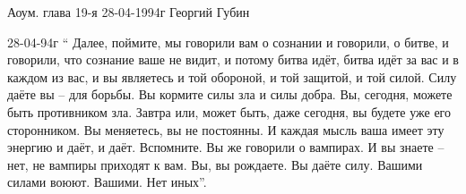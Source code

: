 Аоум. глава 19-я 28-04-1994г
Георгий Губин
 
\people{**}
 28-04-94г   `` Далее, поймите, мы говорили вам о сознании и говорили, о битве, и говорили, что сознание ваше не видит, и потому битва идёт, битва идёт за вас и в каждом из вас, и вы являетесь и той обороной, и той защитой, и той силой. Силу даёте вы – для борьбы. Вы кормите силы зла и силы добра. Вы, сегодня, можете быть противником зла. Завтра или, может быть, даже сегодня, вы будете уже его сторонником. Вы меняетесь, вы не постоянны. И каждая мысль ваша имеет эту энергию и даёт, и даёт. Вспомните. Вы же говорили о вампирах. И вы знаете – нет, не вампиры приходят к вам. Вы, вы рождаете. Вы даёте силу. Вашими силами воюют. Вашими. Нет иных''.
 
\people{**}
 
